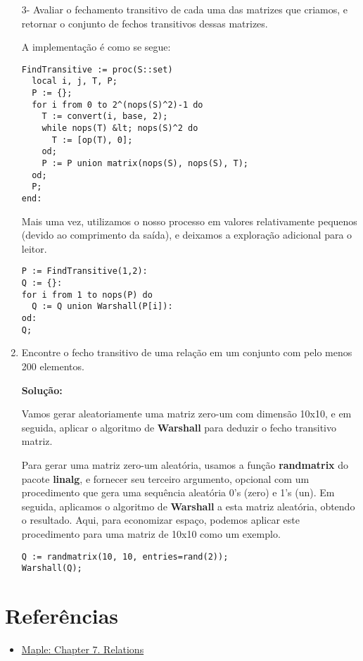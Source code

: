 \documentclass[a4paper]{article}
\begin{document}
\begin{enumerate}
        3- Avaliar o fechamento transitivo de cada uma das matrizes que criamos, e retornar o conjunto de fechos transitivos dessas matrizes.
        
        A implementação é como se segue:

\begin{lstlisting}
FindTransitive := proc(S::set)
  local i, j, T, P;
  P := {};
  for i from 0 to 2^(nops(S)^2)-1 do
    T := convert(i, base, 2);
    while nops(T) &lt; nops(S)^2 do
      T := [op(T), 0];
    od;
    P := P union matrix(nops(S), nops(S), T);
  od;
  P;
end:
\end{lstlisting}

		Mais uma vez, utilizamos o nosso processo em valores relativamente pequenos (devido ao comprimento da saída), e deixamos a exploração adicional para o leitor.

\begin{lstlisting}
P := FindTransitive(1,2):
Q := {}:
for i from 1 to nops(P) do
  Q := Q union Warshall(P[i]):
od:
Q;
\end{lstlisting}

\item{Encontre o fecho transitivo de uma relação em um conjunto com pelo menos 200 elementos.}

	\textbf{Solução:}
    
    	Vamos gerar aleatoriamente uma matriz zero-um com dimensão 10x10, e em seguida, aplicar o algoritmo de \textbf{Warshall} para deduzir o fecho transitivo matriz.
        
        Para gerar uma matriz zero-um aleatória, usamos a função \textbf{randmatrix} do pacote \textbf{linalg}, e fornecer seu terceiro argumento, opcional com um procedimento que gera uma sequência aleatória 0's (zero) e 1's (un). Em seguida, aplicamos o algoritmo de \textbf{Warshall} a esta matriz aleatória, obtendo o resultado. Aqui, para economizar espaço, podemos aplicar este procedimento para uma matriz de 10x10 como um exemplo.

\begin{lstlisting}
Q := randmatrix(10, 10, entries=rand(2));
Warshall(Q);
\end{lstlisting}

\end{enumerate}

\section{Referências}
\begin{itemize}
\item \href{http://www.mhhe.com/math/advmath/rosen/r5/student/ch07/maple.html}{Maple: Chapter 7. Relations}
\end{itemize}

 
\end{document}
